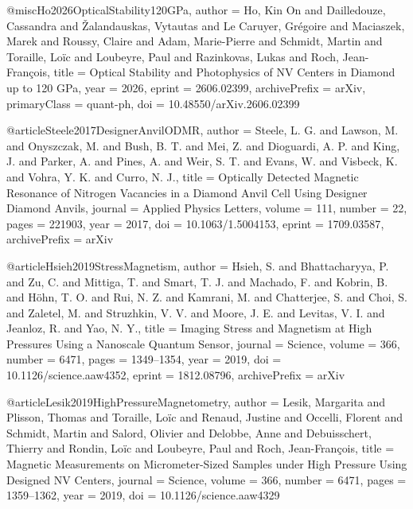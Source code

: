 @misc{Ho2026OpticalStability120GPa,
  author        = {Ho, Kin On and Dailledouze, Cassandra and {\v{Z}}alandauskas, Vytautas and Le Caruyer, Gr{\'e}goire and Maciaszek, Marek and Roussy, Claire and Adam, Marie-Pierre and Schmidt, Martin and Toraille, Lo{\"i}c and Loubeyre, Paul and Razinkovas, Lukas and Roch, Jean-Fran{\c{c}}ois},
  title         = {Optical Stability and Photophysics of {NV} Centers in Diamond up to 120 {GPa}},
  year          = {2026},
  eprint        = {2606.02399},
  archivePrefix = {arXiv},
  primaryClass  = {quant-ph},
  doi           = {10.48550/arXiv.2606.02399}
}


@article{Steele2017DesignerAnvilODMR,
  author  = {Steele, L. G. and Lawson, M. and Onyszczak, M. and Bush, B. T. and Mei, Z. and Dioguardi, A. P. and King, J. and Parker, A. and Pines, A. and Weir, S. T. and Evans, W. and Visbeck, K. and Vohra, Y. K. and Curro, N. J.},
  title   = {Optically Detected Magnetic Resonance of Nitrogen Vacancies in a Diamond Anvil Cell Using Designer Diamond Anvils},
  journal = {Applied Physics Letters},
  volume  = {111},
  number  = {22},
  pages   = {221903},
  year    = {2017},
  doi     = {10.1063/1.5004153},
  eprint  = {1709.03587},
  archivePrefix = {arXiv}
}

@article{Hsieh2019StressMagnetism,
  author  = {Hsieh, S. and Bhattacharyya, P. and Zu, C. and Mittiga, T. and Smart, T. J. and Machado, F. and Kobrin, B. and H{\"o}hn, T. O. and Rui, N. Z. and Kamrani, M. and Chatterjee, S. and Choi, S. and Zaletel, M. and Struzhkin, V. V. and Moore, J. E. and Levitas, V. I. and Jeanloz, R. and Yao, N. Y.},
  title   = {Imaging Stress and Magnetism at High Pressures Using a Nanoscale Quantum Sensor},
  journal = {Science},
  volume  = {366},
  number  = {6471},
  pages   = {1349--1354},
  year    = {2019},
  doi     = {10.1126/science.aaw4352},
  eprint  = {1812.08796},
  archivePrefix = {arXiv}
}

@article{Lesik2019HighPressureMagnetometry,
  author  = {Lesik, Margarita and Plisson, Thomas and Toraille, Lo{\"i}c and Renaud, Justine and Occelli, Florent and Schmidt, Martin and Salord, Olivier and Delobbe, Anne and Debuisschert, Thierry and Rondin, Lo{\"i}c and Loubeyre, Paul and Roch, Jean-Fran{\c{c}}ois},
  title   = {Magnetic Measurements on Micrometer-Sized Samples under High Pressure Using Designed {NV} Centers},
  journal = {Science},
  volume  = {366},
  number  = {6471},
  pages   = {1359--1362},
  year    = {2019},
  doi     = {10.1126/science.aaw4329}
}

